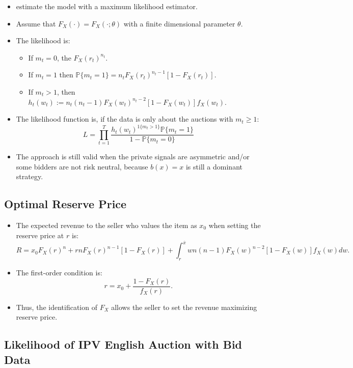 \documentclass[]{book}
\providecommand{\tightlist}{%
  \setlength{\itemsep}{0pt}\setlength{\parskip}{0pt}}
\begin{document}
\begin{itemize}
\tightlist
\item
  \citet{donaldIdentificationEstimationTesting1996} estimate the model
  with a maximum likelihood estimator.
\item
  Assume that \(F_X(\cdot) = F_X(\cdot; \theta)\) with a finite
  dimensional parameter \(\theta\).
\item
  The likelihood is:

  \begin{itemize}
  \tightlist
  \item
    If \(m_t = 0\), the \(F_X(r_t)^{n_t}\).
  \item
    If \(m_t = 1\) then
    \(\mathbb{P}\{m_t = 1\} = n_t F_X(r_t)^{n_t - 1} [1 - F_X(r_t)]\).
  \item
    If \(m_t > 1\), then
    \(h_t(w_t) := n_t (n_t - 1) F_X(w_t)^{n_t - 2} [1 - F_X(w_t)] f_X(w_t)\).
  \end{itemize}
\item
  The likelihood function is, if the data is only about the auctions
  with \(m_t \ge 1\): \[
  L = \prod_{t = 1}^T \frac{h_t(w_t)^{1\{m_t > 1\}} \mathbb{P}\{m_t = 1\}}{1 - \mathbb{P}\{m_t = 0\}}
  \]
\item
  The approach is still valid when the private signals are asymmetric
  and/or some bidders are not risk neutral, because \(b(x) = x\) is
  still a dominant strategy.
\end{itemize}

\subsection{Optimal Reserve Price}\label{optimal-reserve-price}

\begin{itemize}
\tightlist
\item
  The expected revenue to the seller who values the item as \(x_0\) when
  setting the reserve price at \(r\) is: \[
  R = x_0 F_X(r)^n + r n F_X(r)^{n - 1}[1 - F_X(r)] + \int_r^{\overline{x}} w n(n - 1)F_X(w)^{n - 2}[1 - F_X(w)] f_X(w) dw.
  \]
\item
  The first-order condition is: \[
  r = x_0 + \frac{1 - F_X(r)}{f_X(r)}.
  \]
\item
  Thus, the identification of \(F_X\) allows the seller to set the
  revenue maximizing reserve price.
\end{itemize}

\subsection{Likelihood of IPV English Auction with Bid
Data}\label{likelihood-of-ipv-english-auction-with-bid-data}
\end{document}
